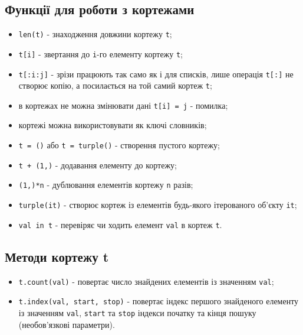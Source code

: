  \subsection{Функції для роботи з кортежами} 
\begin{frame}
\begin{itemize}
  \item \texttt{len(t)} - знаходження довжини  кортежу \texttt{t};
  \item \texttt{t[i]} - звертання до \texttt{i}-го елементу  кортежу \texttt{t};
  \item \texttt{t[:i:j]} - зрізи працюють так само як і для списків, лише операція \texttt{t[:]} не створює копію, а посилається на той самий кортеж \texttt{t};
  \item в кортежах не можна змінювати дані \texttt{t[i] = j} - помилка;
  \item кортежі можна використовувати як ключі словників;
\end{itemize}

\end{frame}

\begin{frame}
\begin{itemize}
  \item \texttt{t = ()} або \texttt{t = turple()} - створення пустого кортежу;
  \item \texttt{t + (1,)} - додавання елементу до кортежу;
  \item \texttt{(1,)*n} - дублювання елементів кортежу \texttt{n} разів;
  \item \texttt{turple(it)} - створює кортеж із елементів будь-якого ітерованого об'єкту \texttt{it};
  \item \texttt{val in t} - перевіряє чи ходить елемент \texttt{val} в кортеж \texttt{t}.
\end{itemize}

\end{frame}

\subsection{Методи кортежу t} 
\begin{frame}
    \begin{itemize}
        \item<1-> \texttt{t.count(val)} - повертає число знайдених елементів із значенням \texttt{val};
        \item<2-> \texttt{t.index(val, start, stop)} - повертає індекс першого знайденого елементу із значенням \texttt{val}, \texttt{start} та \texttt{stop} індекси початку та кінця пошуку (необов'язкові параметри).
    \end{itemize}
\end{frame}

